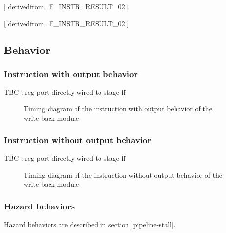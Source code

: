       [
          derivedfrom=F\_INSTR\_RESULT\_02
        ]

      [
          derivedfrom=F\_INSTR\_RESULT\_02
        ]

  \subsection{Behavior}

    \subsubsection{Instruction with output behavior}

      \begin{content}
          TBC : reg port directly wired to stage ff
        \end{content}

      \begin{figure}[H]
          \centering
          
          \caption{Timing diagram of the instruction with output behavior of the write-back module}
          \label{fig:wbm-behavior-instruction-with-output}
        \end{figure}

    \subsubsection{Instruction without output behavior}

      \begin{content}
          TBC : reg port directly wired to stage ff
        \end{content}

      \begin{figure}[H]
          \centering
          
          \caption{Timing diagram of the instruction without output behavior of the write-back module}
          \label{fig:wbm-behavior-instruction-without-output}
        \end{figure}

    \subsubsection{Hazard behaviors}

      \begin{content}
          Hazard behaviors are described in section \ref{pipeline-stall}.
        \end{content}

\newpage
